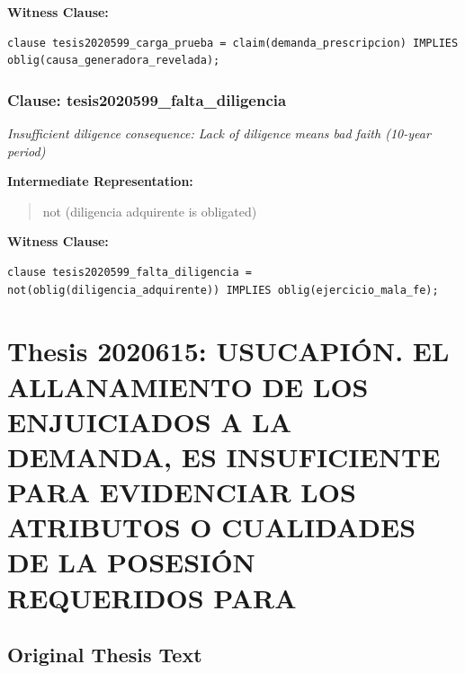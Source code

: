\documentclass[11pt,a4paper]{article}
\begin{document}
\textbf{Witness Clause:}

\begin{lstlisting}[style=witnessstyle, language=Witness]
clause tesis2020599_carga_prueba = claim(demanda_prescripcion) IMPLIES oblig(causa_generadora_revelada);
\end{lstlisting}

\subsubsection{Clause: tesis2020599\_falta\_diligencia}

\textit{Insufficient diligence consequence: Lack of diligence means bad faith (10-year period)}

\textbf{Intermediate Representation:}

\begin{quote}
not (diligencia adquirente is obligated)
\end{quote}

\textbf{Witness Clause:}

\begin{lstlisting}[style=witnessstyle, language=Witness]
clause tesis2020599_falta_diligencia = not(oblig(diligencia_adquirente)) IMPLIES oblig(ejercicio_mala_fe);
\end{lstlisting}

\newpage

\section{Thesis 2020615: USUCAPIÓN. EL ALLANAMIENTO DE LOS ENJUICIADOS A LA DEMANDA, ES INSUFICIENTE PARA EVIDENCIAR LOS ATRIBUTOS O CUALIDADES DE LA POSESIÓN REQUERIDOS PARA}
\label{thesis:2020615}

\subsection{Original Thesis Text}
\end{document}
